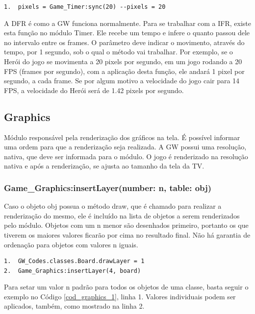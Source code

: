 \documentclass[
	12pt,				%
	openright,			%
	oneside,			%
	a4paper,			%
	brazil,				%
	]{abntex2}
\begin{document}
\begin{lstlisting}[caption={Exemplo de uso da função sync},label=cod_timer_1,frame=single]
1.	pixels = Game_Timer:sync(20) --pixels = 20
\end{lstlisting}

A DFR é como a GW funciona normalmente. Para se trabalhar com a IFR, existe esta função no módulo Timer. Ele recebe um tempo e infere o quanto passou dele no intervalo entre os frames. O parâmetro deve indicar o movimento, através do tempo, por 1 segundo, sob o qual o método vai trabalhar. Por exemplo, se o Herói do jogo se movimenta a 20 pixels por segundo, em um jogo rodando a 20 FPS (frames por segundo), com a aplicação desta função, ele andará 1 pixel por segundo, a cada frame. Se por algum motivo a velocidade do jogo cair para 14 FPS, a velocidade do Herói será de 1.42 pixels por segundo.

\subsection{Graphics}

Módulo responsável pela renderização dos gráficos na tela. É possível informar uma ordem para que a renderização seja realizada. A GW possui uma resolução, nativa, que deve ser informada para o módulo. O jogo é renderizado na resolução nativa e após a renderização, se ajusta ao tamanho da tela da TV.

\subsubsection{Game\_Graphics:insertLayer(number: n, table: obj)}

Caso o objeto obj possua o método draw, que é chamado para realizar a renderização do mesmo, ele é incluído na lista de objetos a serem renderizados pelo módulo. Objetos com um n menor são desenhados primeiro, portanto os que tiverem os maiores valores ficarão por cima no resultado final. Não há garantia de ordenação para objetos com valores n iguais.

\begin{lstlisting}[caption={Definindo a ordem de renderização para a classe Board},label=cod_graphics_1,frame=single]
1.	GW_Codes.classes.Board.drawLayer = 1
2.	Game_Graphics:insertLayer(4, board)
\end{lstlisting}

Para setar um valor n padrão para todos os objetos de uma classe, basta seguir o exemplo no Código \ref{cod_graphics_1}, linha 1. Valores individuais podem ser aplicados, também, como mostrado na linha 2.
\end{document}

